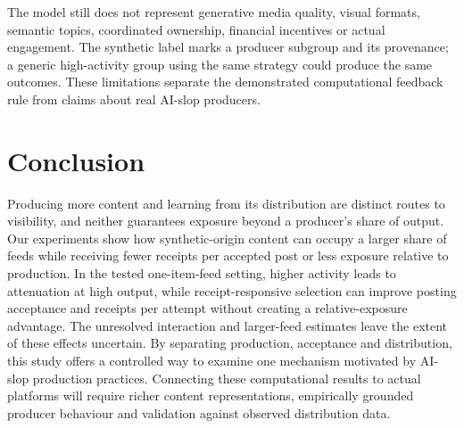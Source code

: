 \documentclass[runningheads]{llncs}
\begin{document}
The model still does not represent generative media quality, visual formats, semantic topics, coordinated ownership, financial incentives or actual engagement. The synthetic label marks a producer subgroup and its provenance; a generic high-activity group using the same strategy could produce the same outcomes. These limitations separate the demonstrated computational feedback rule from claims about real AI-slop producers.

\section{Conclusion}

Producing more content and learning from its distribution are distinct routes to visibility, and neither guarantees exposure beyond a producer's share of output. Our experiments show how synthetic-origin content can occupy a larger share of feeds while receiving fewer receipts per accepted post or less exposure relative to production. In the tested one-item-feed setting, higher activity leads to attenuation at high output, while receipt-responsive selection can improve posting acceptance and receipts per attempt without creating a relative-exposure advantage. The unresolved interaction and larger-feed estimates leave the extent of these effects uncertain. By separating production, acceptance and distribution, this study offers a controlled way to examine one mechanism motivated by AI-slop production practices. Connecting these computational results to actual platforms will require richer content representations, empirically grounded producer behaviour and validation against observed distribution data.



%
\end{document}
